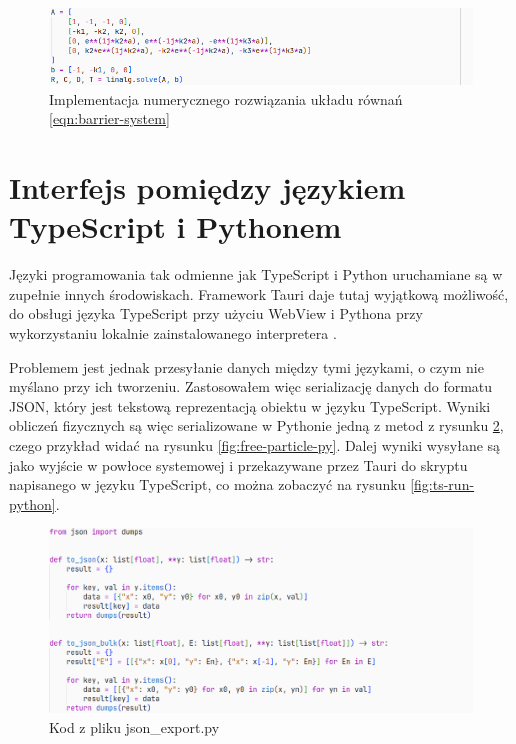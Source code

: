 \documentclass{SGGW-thesis}
\begin{document}
	\begin{figure}[H]
		\includegraphics[width=\textwidth,height=\textheight,keepaspectratio]{linalg solve.png} 
		\caption{Implementacja numerycznego rozwiązania układu równań \ref{eqn:barrier-system}}
		\label{fig:linalg-solve}
	\end{figure}

		
	\section{Interfejs pomiędzy językiem TypeScript i Pythonem}
		Języki programowania tak odmienne jak TypeScript i Python uruchamiane są w zupełnie innych środowiskach. Framework Tauri daje tutaj wyjątkową możliwość, do obsługi języka TypeScript przy użyciu WebView \cite{tauri-arch} i Pythona przy wykorzystaniu lokalnie zainstalowanego interpretera \cite{tauri-shell}.
		
		Problemem jest jednak przesyłanie danych między tymi językami, o czym nie myślano przy ich tworzeniu. Zastosowałem więc serializację danych do formatu JSON, który jest tekstową reprezentacją obiektu w języku TypeScript. Wyniki obliczeń fizycznych są więc serializowane w Pythonie jedną z metod z rysunku \ref{fig:to-json}, czego przykład widać na rysunku \ref{fig:free-particle-py}. Dalej wyniki wysyłane są jako wyjście w powłoce systemowej i przekazywane przez Tauri do skryptu napisanego w języku TypeScript, co można zobaczyć na rysunku \ref{fig:ts-run-python}.
		
	\begin{figure}[H]
	\includegraphics[width=\textwidth,height=\textheight,keepaspectratio]{to_json.png} 
	\caption{Kod z pliku json\_export.py}
	\label{fig:to-json}
	\end{figure}	
	
\end{document}
